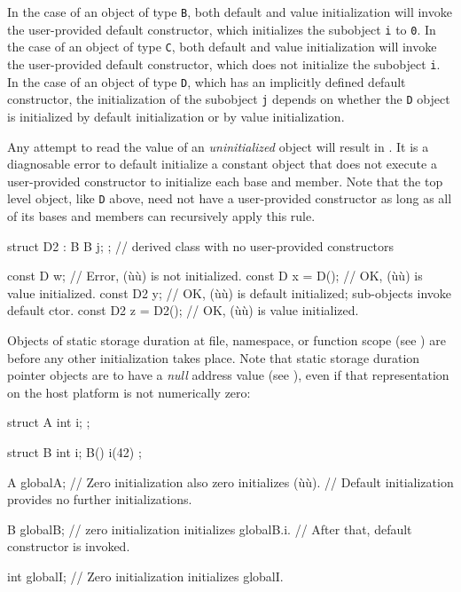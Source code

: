 \noindent In the case of an object of type \lstinline!B!, both default and value
initialization will invoke the user-provided default constructor, which
initializes the subobject \lstinline!i! to \lstinline!0!. In the case of an
object of type \lstinline!C!, both default and value initialization will
invoke the user-provided default constructor, which does not initialize
the subobject \lstinline!i!. In the case of an object of type \lstinline!D!,
which has an implicitly defined default constructor, the initialization
of the subobject \lstinline!j! depends on whether the \lstinline!D! object is
initialized by default initialization or by value initialization.

Any attempt to read the value of an \emph{uninitialized} object will
result in . It is a diagnosable error to
default initialize a constant object that does not execute a
user-provided constructor to initialize each base and member. Note that
the top level object, like \lstinline!D! above, need not have a
user-provided constructor as long as all of its bases and members can
recursively apply this rule.

\begin{emcppslisting}
struct D2 : B { B j; };  // derived class with no user-provided constructors

const D  w;         // Error, (ù{}ù) is not initialized.
const D  x = D();   // OK, (ù{}ù) is value initialized.
const D2 y;         // OK, (ù{}ù) is default initialized; sub-objects invoke default ctor.
const D2 z = D2();  // OK, (ù{}ù) is value initialized.
\end{emcppslisting}


\noindent Objects of static storage duration at file, namespace, or function scope
(see ) are
 before any other initialization takes
place. Note that  static storage
duration pointer objects are  to have a
\emph{null} address value (see ), even if that
representation on the host platform is not numerically zero:

\begin{emcppslisting}
struct A
{
    int i;
};

struct B
{
    int i;
    B() i(42) { }
};

A globalA;
    // Zero initialization also zero initializes (ù{}ù).
    // Default initialization provides no further initializations.

B globalB;
    // zero initialization initializes globalB.i.
    // After that, default constructor is invoked.

int globalI;
    // Zero initialization initializes globalI.
\end{emcppslisting}


